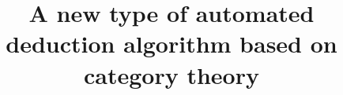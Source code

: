\documentclass{aims}
\numberwithin{equation}{section}
\begin{document}
\title{A new type of automated deduction algorithm based on category theory}
	
\maketitle
	
\end{document}
